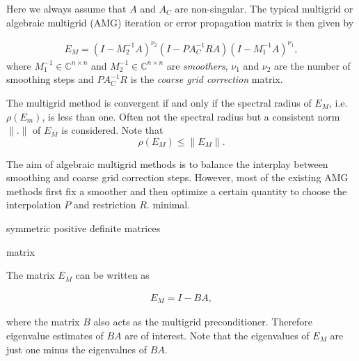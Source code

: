 \documentclass[final]{amsart}
\newcommand{\innCnn}{\in\mathbb{C}^{n\times n}}
\newcommand{\beqo}{\begin{eqnarray*}}
\newcommand{\beq}{\begin{eqnarray}}
\newcommand{\eeqo}{\end{eqnarray*}}
\newcommand{\eeq}{\end{eqnarray}}
\numberwithin{equation}{section}
\begin{document}
Here we always assume  that $A$ and $A_C$ are  non-singular. 
The typical multigrid or algebraic multigrid (AMG) iteration or error
propagation matrix  is then given by

 \beq \label{mgiteration}
E_M = (I-M_2^{-1}A)^{\nu_2}(I -  PA_C^{-1}RA)(I-M_1^{-1}A)^{\nu_1},
\eeq
where $M_1^{-1} \innCnn$ and $M_2^{-1} \innCnn$  are   {\it smoothers}, $\nu_1$
and $\nu_2$  are the number of  smoothing steps and $PA_C^{-1}R$ is the {\it
coarse grid
correction} matrix. 

The multigrid method is convergent if and only if the spectral radius of $E_M$,
i.e. $\rho(E_m)$, is less than one.
Often not the spectral radius but a consistent norm $\|.\|$ of $E_M$ is
considered. Note that
\[
\rho(E_M) \leq \|E_M\|.
\]  

The aim of algebraic multigrid methods is to balance the interplay between
smoothing and coarse grid correction steps. However, most of the existing AMG
methods  first fix a smoother and then optimize a certain quantity to choose
the interpolation $P$ and restriction $R$.
minimal.

symmetric positive definite  matrices

%
matrix

The matrix $E_M$ can be written  as 

 \beq \label{mgb}
E_M = I-BA,
\eeq



where the    matrix $B$  also acts as the multigrid preconditioner. Therefore
eigenvalue estimates of $BA$ are of interest. Note that  the eigenvalues of
$E_M$
are just one  minus the eigenvalues of $BA$.




\end{document}
